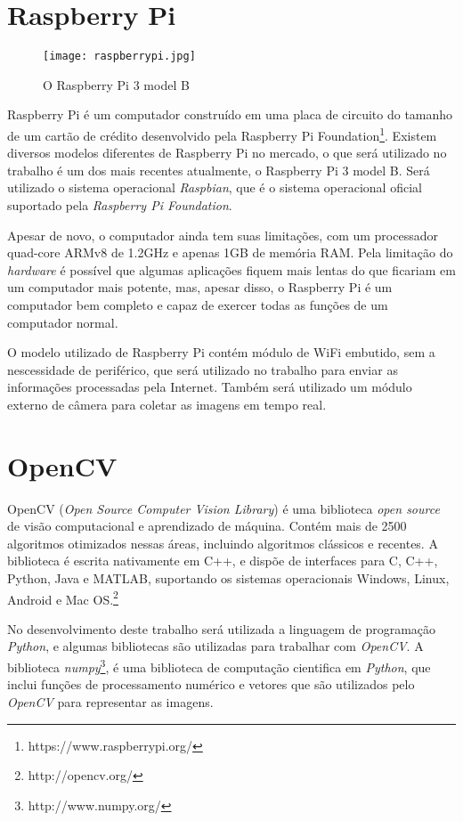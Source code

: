 \section{Raspberry Pi}
\label{sec:raspi}

\begin{figure}[H]
	\centering
	\texttt{[image: raspberrypi.jpg]}
	\caption{O Raspberry Pi 3 model B}
	\label{fig:raspberrypi}
\end{figure}

Raspberry Pi é um computador construído em uma placa de circuito do tamanho de
um cartão de crédito desenvolvido pela Raspberry Pi
Foundation\footnote{https://www.raspberrypi.org/}. Existem diversos modelos
diferentes de Raspberry Pi no mercado, o que será utilizado no trabalho é um dos
mais recentes atualmente, o Raspberry Pi 3 model B. Será utilizado o sistema
operacional \emph{Raspbian}, que é o sistema operacional oficial suportado pela
\emph{Raspberry Pi Foundation}.

Apesar de novo, o computador ainda tem suas limitações, com um processador
quad-core ARMv8 de 1.2GHz e apenas 1GB de memória RAM\@. Pela limitação do
\emph{hardware} é possível que algumas aplicações fiquem mais lentas do que
ficariam em um computador mais potente, mas, apesar disso, o Raspberry Pi é um
computador bem completo e capaz de exercer todas as funções de um computador
normal.

O modelo utilizado de Raspberry Pi contém módulo de WiFi embutido, sem a
nescessidade de periférico, que será utilizado no trabalho para enviar as
informações processadas pela Internet. Também será utilizado um módulo externo
de câmera para coletar as imagens em tempo real.

\section{OpenCV}
\label{sec:opencv}

OpenCV (\emph{Open Source Computer Vision Library}) é uma biblioteca \emph{open
source} de visão computacional e aprendizado de máquina. Contém mais de 2500
algoritmos otimizados nessas áreas, incluindo algoritmos clássicos e recentes. A
biblioteca é escrita nativamente em C++, e dispõe de interfaces para C, C++,
Python, Java e MATLAB, suportando os sistemas operacionais Windows, Linux,
Android e Mac OS.\footnote{http://opencv.org/}

No desenvolvimento deste trabalho será utilizada a linguagem de programação \emph{Python},
e algumas bibliotecas são utilizadas para trabalhar com \emph{OpenCV}. A biblioteca
\emph{numpy}\footnote{http://www.numpy.org/}, é uma biblioteca de computação cientifica em
\emph{Python}, que inclui funções de processamento numérico e vetores que são utilizados
pelo \emph{OpenCV} para representar as imagens.

